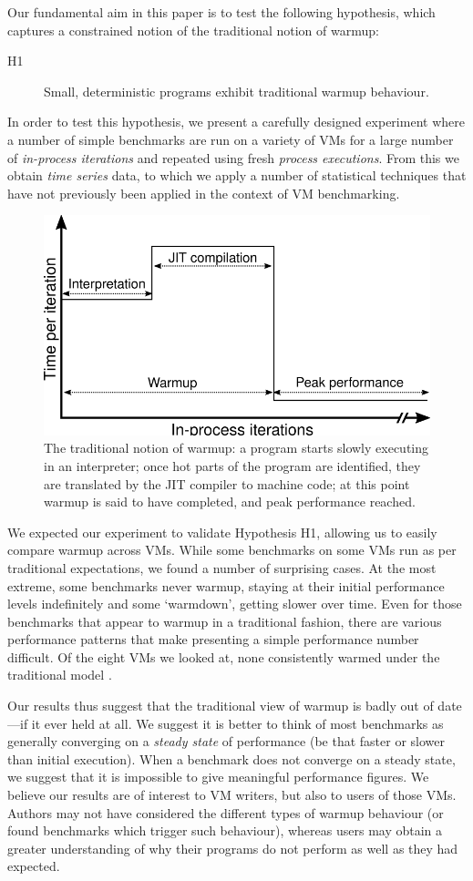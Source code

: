 \documentclass[a4paper,UKenglish]{lipics}
\newcommand{\hypone}{H1\xspace}
\begin{document}
Our fundamental aim in this paper is to test the following hypothesis, which captures a constrained
notion of the traditional notion of warmup:
\begin{description}
  \item[\hypone] Small, deterministic programs exhibit traditional warmup behaviour.
\end{description}
In order to test this hypothesis, we present a carefully designed
experiment where a number of simple benchmarks are run on a variety of
VMs for a large number of \emph{in-process iterations} and repeated using fresh
\emph{process executions}. From this we obtain \emph{time series} data, to which we apply a
number of statistical techniques that have not previously been applied
in the context of VM benchmarking.

\begin{figure}[t]
\centering
\includegraphics[width=.5\textwidth]{img/picturebook_warmup}
\caption{The traditional notion of warmup: a program starts slowly executing in
an interpreter; once hot parts of the program are identified, they are
translated by the JIT compiler to machine code; at this point warmup
is said to have completed, and peak performance reached.}
\label{fig:trad}
\end{figure}

We expected our experiment to validate Hypothesis H1, allowing us to
easily compare warmup across VMs. While some benchmarks on some VMs run as per
traditional expectations, we found a number of surprising cases. At
the most extreme, some benchmarks never warmup, staying at their initial performance
levels indefinitely and some `warmdown', getting slower over time. Even for
those benchmarks that appear to warmup in a traditional fashion, there are
various performance patterns that make presenting a simple performance number
difficult. Of the eight VMs we looked at,
none consistently warmed under the traditional model .

Our results thus suggest that the traditional view of warmup is badly out of
date---if it ever held at all. We suggest it is better to think of most benchmarks as
generally converging on a \emph{steady state} of performance (be that faster or
slower than initial execution). When a benchmark does not converge on a steady
state, we suggest that it is impossible to give meaningful performance figures.
We believe our results are of interest to VM writers, but also to users of
those VMs. Authors may not have considered the different types of warmup
behaviour (or found benchmarks which trigger such behaviour), whereas users may
obtain a greater understanding of why their programs do not perform as well as
they had expected.
\end{document}

